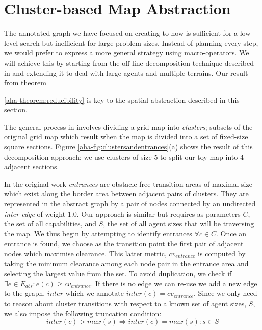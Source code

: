 \section{Cluster-based Map Abstraction}
\label{aha:mapabstraction}
The annotated graph we have focused on creating to now is sufficient for a low-level search but inefficient for large problem sizes. 
Instead of planning every step, we would prefer to express a more general strategy using macro-operators.
We will achieve this by starting from the off-line decomposition technique described in \cite{botea04} and extending it to deal with large agents and multiple terrains. 
Our result from theorem {\ref{aha-theorem:reducibility} is key to the spatial abstraction described in this section. 
\par \indent
The general process in \cite{botea04} involves dividing a grid map into \emph{clusters}; subsets of the original grid map which result when the map is divided into a set of fixed-size square sections. Figure \ref{aha-fig:clustersandentrances}(a) shows the result of this decomposition approach; we use clusters of size 5 to split our toy map into 4 adjacent sections.
\par \indent
In the original work \emph{entrances} are obstacle-free transition areas of maximal size which exist along the border area between adjacent pairs of clusters. They are represented in the abstract graph by a pair of nodes connected by an undirected \emph{inter-edge} of weight 1.0. 
Our approach is similar but requires as parameters $C$, the set of all capabilities, and $S$, the set of all agent sizes that will be traversing the map. 
We thus begin by attempting to identify entrances $\forall c \in C$. 
Once an entrance is found, we choose as the transition point the first pair of adjacent nodes which maximise clearance. 
This latter metric, $cv_{entrance}$ is computed by taking the minimum clearance among each node pair in the entrance area and selecting the largest value from the set. 
To avoid duplication, we check if $\exists e \in E_{abs} : e(c) \geq cv_{entrance}$. If there is no edge we can re-use we add a new edge to the graph, $inter$ which we annotate $inter(c) = cv_{entrance}$. 
Since we only need to reason about cluster transitions with respect to a known set of agent sizes, $S$, we also impose the following truncation condition:
\begin{equation}
inter(c) > max(s) \Rightarrow inter(c) = max(s) : s \in S
\end{equation}
\par \indent
}
